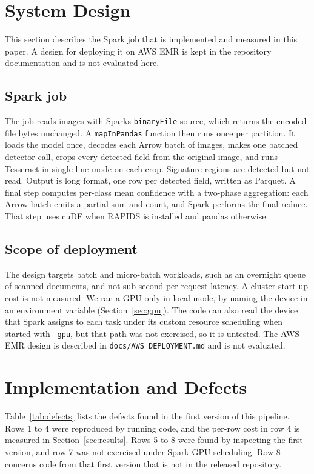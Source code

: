 \section{System Design}\label{sec:design}
This section describes the Spark job that is implemented and measured in this paper. A design for deploying it on AWS EMR is kept in the repository documentation and is not evaluated here.

\subsection{Spark job}
The job reads images with Spark\textquotesingle{}s \texttt{binaryFile} source, which returns the encoded file bytes unchanged. A \texttt{mapInPandas} function then runs once per partition. It loads the model once, decodes each Arrow batch of images, makes one batched detector call, crops every detected field from the original image, and runs Tesseract in single-line mode on each crop. Signature regions are detected but not read. Output is long format, one row per detected field, written as Parquet. A final step computes per-class mean confidence with a two-phase aggregation: each Arrow batch emits a partial sum and count, and Spark performs the final reduce. That step uses cuDF when RAPIDS is installed and pandas otherwise.

\subsection{Scope of deployment}
The design targets batch and micro-batch workloads, such as an overnight queue of scanned documents, and not sub-second per-request latency. A cluster start-up cost is not measured. We ran a GPU only in local mode, by naming the device in an environment variable (Section~\ref{sec:gpu}). The code can also read the device that Spark assigns to each task under its custom resource scheduling \cite{spark_resources} when started with \texttt{--gpu}, but that path was not exercised, so it is untested. The AWS EMR design is described in \texttt{docs/AWS\_DEPLOYMENT.md} and is not evaluated.

\section{Implementation and Defects}\label{sec:impl}
Table~\ref{tab:defects} lists the defects found in the first version of this pipeline. Rows 1 to 4 were reproduced by running code, and the per-row cost in row 4 is measured in Section~\ref{sec:results}. Rows 5 to 8 were found by inspecting the first version, and row 7 was not exercised under Spark GPU scheduling. Row 8 concerns code from that first version that is not in the released repository.

